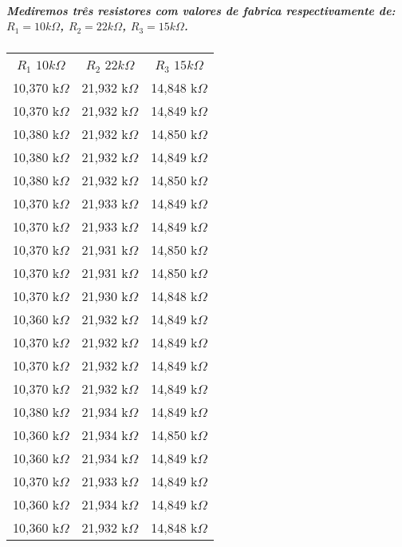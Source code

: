 \documentclass[12pt,twoside, a4paper, twocolumn]{article}
\begin{document}
\subparagraph*{Mediremos três resistores com valores de fabrica respectivamente de: $R_1 = 10k\varOmega$, $R_2 = 22k\varOmega$, $R_3 = 15k\varOmega$.}
\begin{center}
    \begin{tabular}{ |c|c|c| }
        \hline
        $R_1$ $10k\varOmega$ & $R_2$ $22k\varOmega$ & $R_3$ $15k\varOmega$ \\
        10,370 k$\varOmega$    & 21,932 k$\varOmega$    & 14,848 k$\varOmega$    \\
        10,370 k$\varOmega$    & 21,932 k$\varOmega$    & 14,849 k$\varOmega$    \\
        10,380 k$\varOmega$    & 21,932 k$\varOmega$    & 14,850 k$\varOmega$    \\
        10,380 k$\varOmega$    & 21,932 k$\varOmega$    & 14,849 k$\varOmega$    \\
        10,380 k$\varOmega$    & 21,932 k$\varOmega$    & 14,850 k$\varOmega$    \\
        10,370 k$\varOmega$    & 21,933 k$\varOmega$    & 14,849 k$\varOmega$    \\
        10,370 k$\varOmega$    & 21,933 k$\varOmega$    & 14,849 k$\varOmega$    \\
        10,370 k$\varOmega$    & 21,931 k$\varOmega$    & 14,850 k$\varOmega$    \\
        10,370 k$\varOmega$    & 21,931 k$\varOmega$    & 14,850 k$\varOmega$    \\
        10,370 k$\varOmega$    & 21,930 k$\varOmega$    & 14,848 k$\varOmega$    \\
        10,360 k$\varOmega$    & 21,932 k$\varOmega$    & 14,849 k$\varOmega$    \\
        10,370 k$\varOmega$    & 21,932 k$\varOmega$    & 14,849 k$\varOmega$    \\
        10,370 k$\varOmega$    & 21,932 k$\varOmega$    & 14,849 k$\varOmega$    \\
        10,370 k$\varOmega$    & 21,932 k$\varOmega$    & 14,849 k$\varOmega$    \\
        10,380 k$\varOmega$    & 21,934 k$\varOmega$    & 14,849 k$\varOmega$    \\
        10,360 k$\varOmega$    & 21,934 k$\varOmega$    & 14,850 k$\varOmega$    \\
        10,360 k$\varOmega$    & 21,934 k$\varOmega$    & 14,849 k$\varOmega$    \\
        10,370 k$\varOmega$    & 21,933 k$\varOmega$    & 14,849 k$\varOmega$    \\
        10,360 k$\varOmega$    & 21,934 k$\varOmega$    & 14,849 k$\varOmega$    \\
        10,360 k$\varOmega$    & 21,932 k$\varOmega$    & 14,848 k$\varOmega$    \\

        \hline
    \end{tabular}
\end{center}
\end{document}
